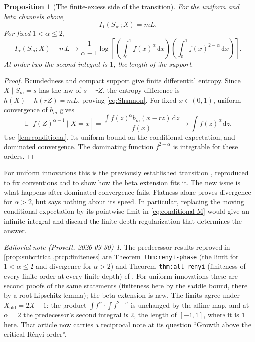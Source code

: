 \documentclass[11pt,a4paper]{article}
\numberwithin{equation}{section}
\newtheorem{proposition}[proposition]{Proposition}
\theoremstyle{definition}\newaliascnt{definition}{theorem}
\theoremstyle{remark}\newaliascnt{remark}{theorem}
\newtheorem*{ednote}{Editorial note (ProveIt, 2026-09-30)}
\newcommand{\E}{\mathbb E}\newcommand{\Prb}{\mathbb P}
\newcommand{\dd}{\,\mathrm d}
\begin{document}
\begin{proposition}[The finite-excess side of the transition]
\label{prop:subcritical}
For the uniform and beta channels above,
\begin{equation}
 I_1(S_m;X)=mL.
 \label{eq:Shannon}
\end{equation}
For fixed $1<\alpha\le2$,
\begin{equation}
 I_\alpha(S_m;X)-mL\longrightarrow
 \frac1{\alpha-1}\log\left[
   \left(\int_0^1 f(x)^\alpha\dd x\right)
   \left(\int_0^1 f(x)^{2-\alpha}\dd x\right)\right].
 \label{eq:subcritical-limit}
\end{equation}
At order two the second integral is $1$, the length of the support.
\end{proposition}
\begin{proof}
Boundedness and compact support give finite differential entropy. Since
$X\mid S_m=s$ has the law of $s+rZ$, the entropy difference is
$h(X)-h(rZ)=mL$, proving \eqref{eq:Shannon}.
For fixed $x\in(0,1)$, uniform convergence of $b_m$ gives
\[
 \E[f(Z)^{\alpha-1}\mid X=x]
 =\frac{\int f(z)^\alpha b_m(x-rz)\dd z}{f(x)}
 \longrightarrow \int f(z)^\alpha\dd z.
\]
Use \cref{lem:conditional}, its uniform bound on the conditional expectation,
and dominated convergence. The dominating function $f^{2-\alpha}$ is
integrable for these orders.
\end{proof}
For uniform innovations this is the previously established transition
\cite{prior}, reproduced to fix conventions and to show how the beta extension
fits it. The new issue is what happens after dominated convergence fails.
Flatness alone proves divergence for $\alpha>2$, but says nothing about its
speed. In particular, replacing the moving conditional expectation by its
pointwise limit in \eqref{eq:conditional-M} would give an infinite integral
and discard the finite-depth regularization that determines the answer.
\begin{ednote}
The predecessor results reproved in \cref{prop:subcritical,prop:finiteness}
are Theorem~\texttt{thm:renyi-phase} (the limit for $1<\alpha\le2$ and
divergence for $\alpha>2$) and Theorem~\texttt{thm:all-renyi} (finiteness
of every finite order at every finite depth) of
.
For uniform innovations these are second proofs of the same statements
(finiteness here by the saddle bound, there by a root-Lipschitz lemma);
the beta extension is new. The limits agree under $X_{\mathrm{old}}=2X-1$:
the product $\int f^\alpha\cdot\int f^{2-\alpha}$ is unchanged by the affine
map, and at $\alpha=2$ the predecessor's second integral is $2$, the length
of $[-1,1]$, where it is $1$ here. That article now carries a reciprocal
note at its question ``Growth above the critical R\'enyi order''.
\end{ednote}
\end{document}

